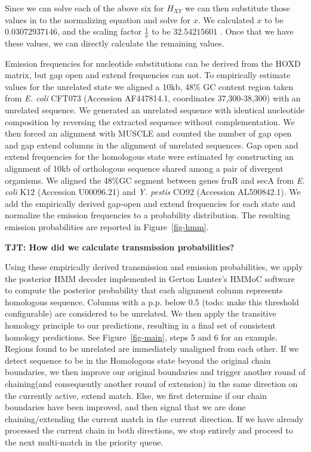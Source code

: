 \documentclass{ws-procs9x6}
\begin{document}
Since we can solve each of the above six for $H_{XY}$ we can then substitute those values in to the
normalizing equation and solve for $x$. We calculated $x$ to be $0.03072937146$, and the scaling factor $\frac{1}{x}$ to be $32.54215601$ . Once that we have these values, we can directly calculate the remaining values.

Emission frequencies for nucleotide substitutions can be derived from the HOXD matrix, but gap open and extend frequencies can not.  To empirically estimate values for the unrelated state we aligned a 10kb, 48\% GC content region taken from \emph{E. coli} CFT073 (Accession AF447814.1, coordinates 37,300-38,300) with an unrelated sequence.  We generated an unrelated sequence with identical nucleotide composition by reversing the extracted sequence without complementation.  We then forced an alignment with MUSCLE and counted the number of gap open and gap extend columns in the alignment of unrelated sequences.  Gap open and extend frequencies for the homologous state were estimated by constructing an alignment of 10kb of orthologous sequence shared among a pair of divergent organisms.  We aligned the 48\%GC segment between genes fruR and secA from \textit{E. coli} K12 (Accession U00096.21) and \emph{Y. pestis} CO92 (Accession AL590842.1). We add the empirically derived gap-open and extend frequencies for each state and normalize the emission frequencies to a probability distribution.  The resulting emission probabilities are reported in Figure~\ref{fig-hmm}.

\textbf{TJT: How did we calculate transmission probabilities?}

Using these empirically derived transmission and emission probabilities, we apply the posterior HMM decoder implemented in Gerton Lunter's HMMoC software~\cite{hmmoc} to compute the posterior probability that each alignment column represents homologous sequence.  Columns with a p.p. below 0.5 (todo: make this threshold configurable) are considered to be unrelated.  We then apply the transitive homology principle to our predictions, resulting in a final set of consistent homology predictions.  See Figure~\ref{fig-main}, steps 5 and 6 for an example. Regions found to be unrelated are immediately unaligned from each other. If we detect sequence to be in the Homologous state beyond the original chain boundaries,  we then improve our original boundaries and trigger another round of chaining(and consequently another round of extension) in the same direction on the currently active, extend match. Else, we first determine if our chain boundaries have been improved, and then signal that we are done chaining/extending the current match in the current direction. If we have already processed the current chain in both directions, we stop entirely and proceed to the next multi-match in the priority queue.
\end{document}
